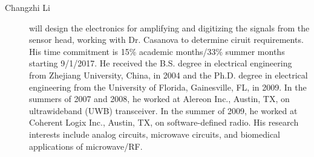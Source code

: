 \begin{description}
  \item[Changzhi Li] will design the electronics for amplifying and digitizing the signals from the sensor head, working with Dr. Casanova to determine ciruit requirements. His time commitment is 15\% academic months/33\% summer months starting 9/1/2017. He received the B.S. degree in electrical engineering from Zhejiang University, China, in 2004 and the Ph.D. degree in electrical engineering from the University of Florida, Gainesville, FL, in 2009. In the summers of 2007 and 2008, he worked at Alereon Inc., Austin, TX, on ultrawideband (UWB) transceiver. In the summer of 2009, he worked at Coherent Logix Inc., Austin, TX, on software-defined radio. His research interests include analog circuits, microwave circuits, and biomedical applications of microwave/RF.
\end{description}


